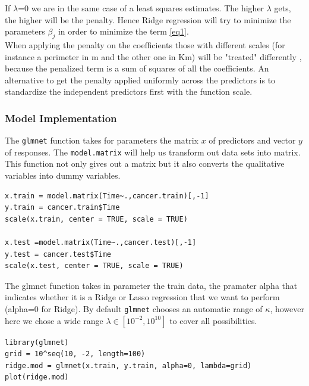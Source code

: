 \documentclass[]{report}
\begin{document}
If $\lambda$=0 we are in the same case of a least squares estimates. The higher $\lambda$ gets, the higher will be the penalty. Hence Ridge regression will try to minimize the parameters $\beta_{j}$ in order to minimize the term \ref{eq1}.\\
When applying the penalty on the coefficients those with different scales (for instance a perimeter in m and the other one in Km) will be "treated" differently , because the penalized term is a sum of squares of all the coefficients. An alternative to get the penalty applied uniformly across the predictors is to standardize the independent predictors first with the function scale.

\subsubsection{Model Implementation}
The \texttt{glmnet} function takes for parameters the matrix $x$ of predictors and vector $y$ of responses. The \texttt{model.matrix} will help us transform out data sets into matrix. This function not only gives out a matrix but it also converts the qualitative variables into dummy variables.
\begin{lstlisting}
x.train = model.matrix(Time~.,cancer.train)[,-1] 
y.train = cancer.train$Time
scale(x.train, center = TRUE, scale = TRUE)

x.test =model.matrix(Time~.,cancer.test)[,-1]
y.test = cancer.test$Time
scale(x.test, center = TRUE, scale = TRUE)
\end{lstlisting}
The glmnet function takes in parameter the train data, the pramater alpha that indicates whether it is a Ridge or Lasso regression that we want to perform (alpha=0 for Ridge). By default \texttt{glmnet} chooses an automatic range of $\kappa$, however here we chose a wide range $\lambda\in[10^{−2},10^{10}]$ to cover all possibilities.

\begin{lstlisting}
library(glmnet)
grid = 10^seq(10, -2, length=100)
ridge.mod = glmnet(x.train, y.train, alpha=0, lambda=grid)
plot(ridge.mod)
\end{lstlisting}
\end{document}
